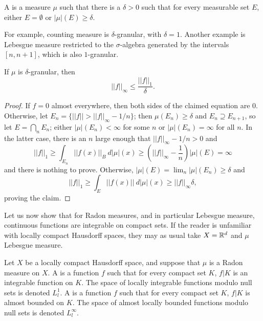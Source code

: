 \begin{definition}
A  is a measure $\mu$ such that there is a $\delta > 0$ such that for every measurable set $E$, either $E = \emptyset$ or $|\mu|(E) \geq \delta$.
\end{definition}

\begin{subsec}
For example, counting measure is $\delta$-granular, with $\delta = 1$.
Another example is Lebesgue measure restricted to the $\sigma$-algebra generated by the intervals $[n, n+1]$, which is also $1$-granular.
\end{subsec}

\begin{lemma}
If $\mu$ is $\delta$-granular, then
\[||f||_{\infty} \leq \frac{||f||_1}{\delta}.\]
\end{lemma}
\begin{proof}
If $f = 0$ almost everywhere, then both sides of the claimed equation are $0$.
Otherwise, let $E_{n} = \{||f|| > ||f||_{\infty} - 1/n\}$; then $\mu(E_{n}) \geq \delta$ and $E_{n} \supseteq E_{n+1}$, so let $E = \bigcap_{n} E_{n}$; either $|\mu|(E_{n}) < \infty$ for some $n$ or $|\mu|(E_{n}) = \infty$ for all $n$.
In the latter case, there is an $n$ large enough that $||f||_{\infty} - 1/n > 0$ and
\[||f||_1 \geq \int_{E_{n}} ||f(x)||_{B} ~d|\mu|(x) \geq (||f||_{\infty} - \frac{1}{n}) |\mu|(E) = \infty\]
and there is nothing to prove. Otherwise, $|\mu|(E) = \lim_{n} |\mu|(E_{n}) \geq \delta$ and
\[||f||_1 \geq \int_{E} ||f(x)||~d|\mu|(x) \geq ||f||_{\infty} \delta,\]
proving the claim.
\end{proof}

\begin{subsec}
Let us now show that for Radon measures, and in particular Lebesgue measure, continuous functions are integrable on compact sets.
If the reader is unfamiliar with locally compact Hausdorff spaces, they may as usual take $X = \mathbb{R}^d$ and $\mu$ Lebesgue measure.
\end{subsec}

\begin{definition}
Let $X$ be a locally compact Hausdorff space, and suppose that $\mu$ is a Radon measure on $X$.
A  is a function $f$ such that for every compact set $K$, $f|K$ is an integrable function on $K$.
The space of locally integrable functions modulo null sets is denoted $L^1_l$.
A  is a function $f$ such that for every compact set $K$, $f|K$ is almost bounded on $K$.
The space of almost locally bounded functions modulo null sets is denoted $L^\infty_l$.
\end{definition}

